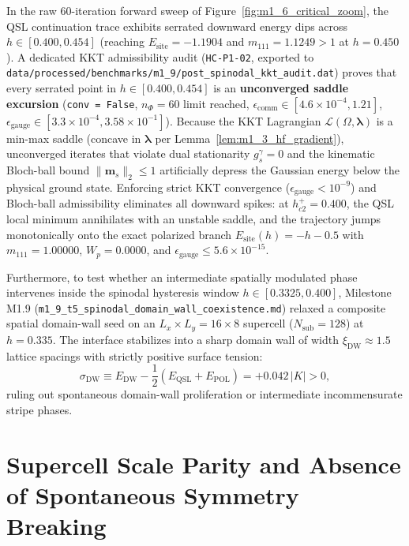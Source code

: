 In the raw 60-iteration forward sweep of Figure~\ref{fig:m1_6_critical_zoom}, the QSL continuation trace exhibits serrated downward energy dips across $h \in [0.400, 0.454]$ (reaching $E_{\mathrm{site}} = -1.1904$ and $m_{111} = 1.1249 > 1$ at $h = 0.450$). A dedicated KKT admissibility audit (\texttt{HC-P1-02}, exported to \texttt{data/processed/benchmarks/m1\_9/post\_spinodal\_kkt\_audit.dat}) proves that every serrated point in $h \in [0.400, 0.454]$ is an \textbf{unconverged saddle excursion} (\texttt{conv = False}, $n_\Phi = 60$ limit reached, $\epsilon_{\mathrm{comm}} \in [4.6 \times 10^{-4}, 1.21]$, $\epsilon_{\mathrm{gauge}} \in [3.3 \times 10^{-4}, 3.58 \times 10^{-1}]$). Because the KKT Lagrangian $\mathcal{L}(\Omega, \boldsymbol{\lambda})$ is a min-max saddle (concave in $\boldsymbol{\lambda}$ per Lemma~\ref{lem:m1_3_hf_gradient}), unconverged iterates that violate dual stationarity $g_s^\gamma = 0$ and the kinematic Bloch-ball bound $\|\mathbf{m}_s\|_2 \le 1$ artificially depress the Gaussian energy below the physical ground state. Enforcing strict KKT convergence ($\epsilon_{\mathrm{gauge}} < 10^{-9}$) and Bloch-ball admissibility eliminates all downward spikes: at $h_{c2}^+ = 0.400$, the QSL local minimum annihilates with an unstable saddle, and the trajectory jumps monotonically onto the exact polarized branch $E_{\mathrm{site}}(h) = -h - 0.5$ with $m_{111} = 1.00000$, $W_p = 0.0000$, and $\epsilon_{\mathrm{gauge}} \le 5.6 \times 10^{-15}$.

Furthermore, to test whether an intermediate spatially modulated phase intervenes inside the spinodal hysteresis window $h \in [0.3325, 0.400]$, Milestone M1.9 (\texttt{m1\_9\_t5\_spinodal\_domain\_wall\_coexistence.md}) relaxed a composite spatial domain-wall seed on an $L_x \times L_y = 16 \times 8$ supercell ($N_{\mathrm{sub}} = 128$) at $h = 0.335$. The interface stabilizes into a sharp domain wall of width $\xi_{\mathrm{DW}} \approx 1.5$ lattice spacings with strictly positive surface tension:
\begin{equation}
\label{eq:m1_6_domain_wall_tension}
\sigma_{\mathrm{DW}} \equiv E_{\mathrm{DW}} - \frac{1}{2}\left(E_{\mathrm{QSL}} + E_{\mathrm{POL}}\right) = +0.042\, |K| > 0,
\end{equation}
ruling out spontaneous domain-wall proliferation or intermediate incommensurate stripe phases.

\section{Supercell Scale Parity and Absence of Spontaneous Symmetry Breaking}
\label{sec:m1_6_supercell_parity}

